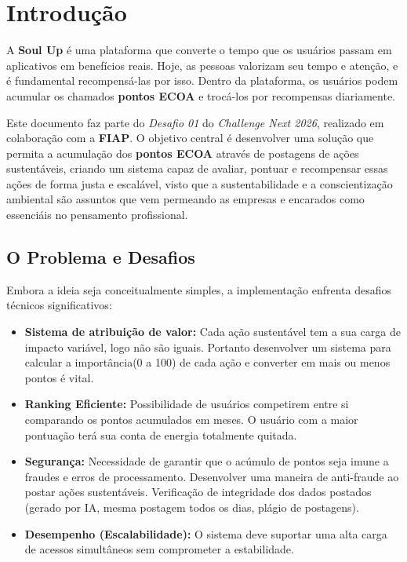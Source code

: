\documentclass[
  12pt,
  a4paper,
  oneside,
  chapter=TITLE,
  section=TITLE,
  brazil
]{abntex2}
\author{Felipe Lima \\ Giovanni Zorzetto \\  Raphael Gomes}
\begin{document}
\frenchspacing



\imprimirfolhaderosto

\tableofcontents*
\cleardoublepage

\textual

\chapter{Introdução}

A \textbf{Soul Up} é uma plataforma que converte o tempo que os usuários passam em aplicativos em benefícios reais. Hoje, as pessoas valorizam seu tempo e atenção, e é fundamental recompensá-las por isso. Dentro da plataforma, os usuários podem acumular os chamados \textbf{pontos ECOA} e trocá-los por recompensas diariamente.

Este documento faz parte do \textit{Desafio 01} do \textit{Challenge Next 2026}, realizado em colaboração com a \textbf{FIAP}. O objetivo central é desenvolver uma solução que permita a acumulação dos \textbf{pontos ECOA} através de postagens de ações sustentáveis, criando um sistema capaz de avaliar, pontuar e recompensar essas ações de forma justa e escalável, visto que a sustentabilidade e a conscientização ambiental são assuntos que vem permeando as empresas e encarados como essenciáis no pensamento profissional.

\section{O Problema e Desafios}

Embora a ideia seja conceitualmente simples, a implementação enfrenta desafios técnicos significativos:
\begin{itemize}
    \item \textbf{Sistema de atribuição de valor:} Cada ação sustentável tem a sua carga de impacto variável, logo não são iguais. Portanto desenvolver um sistema para calcular a importância(0 a 100) de cada ação e converter em mais ou menos pontos é vital.
    \item \textbf{Ranking Eficiente:} Possibilidade de usuários competirem entre si comparando os pontos acumulados em meses. O usuário com a maior pontuação terá sua conta de energia totalmente quitada.
    \item \textbf{Segurança:} Necessidade de garantir que o acúmulo de pontos seja imune a fraudes e erros de processamento. Desenvolver uma maneira de anti-fraude ao postar ações sustentáveis. Verificação de integridade dos dados postados (gerado por IA, mesma postagem todos os dias, plágio de postagens).
    \item \textbf{Desempenho (Escalabilidade):} O sistema deve suportar uma alta carga de acessos simultâneos sem comprometer a estabilidade.
\end{itemize}
\end{document}
